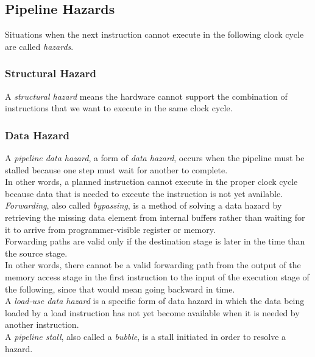 \documentclass[12pt]{article}
\theoremstyle{definition}
\begin{document}
  \subsection{Pipeline Hazards}
  Situations when the next instruction cannot execute in the following clock cycle are called \emph{hazards}.

  \subsubsection{Structural Hazard}
  A \emph{structural hazard} means the hardware cannot support the combination of instructions that we want to execute in the same clock cycle.

  \subsubsection{Data Hazard}
  A \emph{pipeline data hazard}, a form of \emph{data hazard}, occurs when the pipeline must be stalled because one step must wait for another to complete. \\
  In other words, a planned instruction cannot execute in the proper clock cycle because data that is needed to execute the instruction is not yet available. \\

  \emph{Forwarding}, also called \emph{bypassing}, is a method of solving a data hazard by retrieving the missing data element from internal buffers rather than waiting for it to arrive from programmer-visible register or memory. \\
  Forwarding paths are valid only if the destination stage is later in the time than the source stage. \\
  In other words, there cannot be a valid forwarding path from the output of the memory access stage in the first instruction to the input of the execution stage of the following, since that would mean going backward in time. \\

  A \emph{load-use data hazard} is a specific form of data hazard in which the data being loaded by a load instruction has not yet become available when it is needed by another instruction. \\
  A \emph{pipeline stall}, also called a \emph{bubble}, is a stall initiated in order to resolve a hazard.
\end{document}
